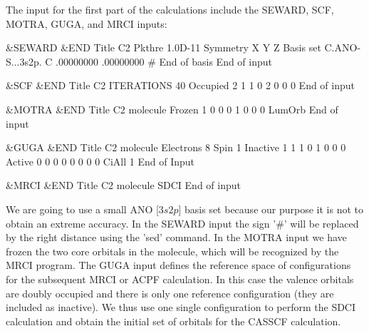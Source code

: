 
The input for the first part of the calculations include the
SEWARD, SCF, MOTRA, GUGA, and MRCI inputs:

\begin{inputlisting}
 &SEWARD &END
Title
 C2
Pkthre
1.0D-11 
Symmetry
  X  Y  Z
Basis set
C.ANO-S...3s2p.
C        .00000000    .00000000   #
End of basis
End of input

 &SCF &END             
Title                 
 C2
ITERATIONS         
 40               
Occupied         
  2  1  1  0  2  0  0  0
End of input 

 &MOTRA &END
Title
 C2 molecule
Frozen
 1 0 0 0 1 0 0 0
LumOrb  
End of input

 &GUGA &END
Title
 C2 molecule
Electrons
    8
Spin
    1
Inactive
    1    1    1    0    1    0    0    0
Active 
    0    0    0    0    0    0    0    0
CiAll
    1
End of Input

 &MRCI &END
Title
 C2 molecule
SDCI
End of input
\end{inputlisting}

We are going to use a small ANO [$3s2p$] basis set because our purpose
it is not to obtain an extreme accuracy.
In the SEWARD input the sign '\#' will be replaced by the right distance
using the 'sed' command. In the MOTRA input we have frozen the two
core orbitals in the molecule, which will be recognized by the MRCI
program. The GUGA input defines the reference space of configurations
for the subsequent MRCI or ACPF calculation. In this case the
valence orbitals are doubly occupied and there is only one reference configuration
(they are included as inactive). We thus use one single
configuration to perform the SDCI calculation and obtain the initial
set of orbitals for the CASSCF calculation.

